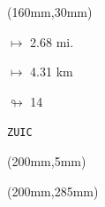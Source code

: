 \begin{textblock*}{40mm}(160mm,30mm)%
\Large
\par$\mapsto$ 2.68 mi.
\par$\mapsto$ 4.31 km
\par$\looparrowright$ 14
\par\hfill\tiny\tt ZUIC\\
\end{textblock*}
\begin{textblock*}{20mm}(200mm,5mm)%
\fbox{\thepage}
\label{ZUIC}
\end{textblock*}
\begin{textblock*}{20mm}(200mm,285mm)%
\fbox{\thepage}
\end{textblock*}

\null\newpage
